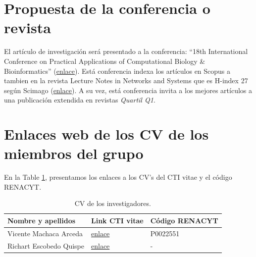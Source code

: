 \documentclass[a4paper]{article}
\begin{document}
\section{Propuesta de la conferencia o revista}

El artículo de investigación será presentado a la conferencia: ``18th International Conference on Practical Applications of Computational Biology \& Bioinformatics'' (\href{https://www.pacbb.net/}{enlace}). Está conferencia indexa los artículos en Scopus a tambien en la revista Lecture Notes in Networks and Systems que es H-index 27 según Scimago (\href{https://www.scimagojr.com/journalsearch.php?q=21100901469&tip=sid&clean=0}{enlace}). A su vez, está conferencia invita a los mejores artículos a una publicación extendida en revistas \textit{Quartil Q1}.


\section{Enlaces web de los CV de los miembros del grupo }

En la Table \ref{tab:inve}, presentamos los enlaces a los CV's del CTI vitae y el código RENACYT.

\begin{table}[H]
\centering
\caption{CV de los investigadores.}
\label{tab:inve}
\setlength{\tabcolsep}{0.5em} %
{\renewcommand{\arraystretch}{1.2}%
\begin{tabular}{|lll|} \hline
\textbf{Nombre y apellidos} & \textbf{Link CTI vitae}                                                                      & \textbf{Código RENACYT} \\ \hline
Vicente Machaca Arceda      & \href{https://dina.concytec.gob.pe/appDirectorioCTI/VerDatosInvestigador.do?id\_investigador=22551}{enlace} & P0022551                \\
Richart Escobedo Quispe     & \href{https://dina.concytec.gob.pe/appDirectorioCTI/VerDatosInvestigador.do?id\_investigador=20597}{enlace} & -     \\ \hline                 
\end{tabular}
}
\end{table}


	
\end{document}
